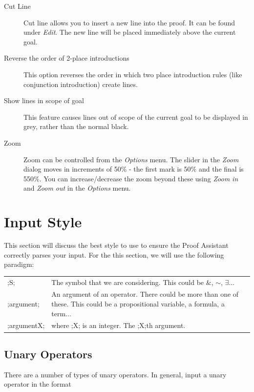 \documentclass[a4paper]{article}
\begin{document}
\begin{description}
	\item[Cut Line] Cut line allows you to insert a new line into the proof. It can be found under \emph{Edit}. The new line will be placed immediately above the current goal.
	\item[Reverse the order of 2-place introductions] This option reverses the order in which two place introduction rules (like conjunction introduction) create lines.
	\item[Show lines in scope of goal] This feature causes lines out of scope of the current goal to be displayed in grey, rather than the normal black.
	\item[Zoom] Zoom can be controlled from the \emph{Options} menu. The slider in the \emph{Zoom} dialog moves in increments of 50\% - the first mark is 50\% and the final is 550\%. You can increase/decrease the zoom beyond these using \emph{Zoom in} and \emph{Zoom out} in the \emph{Options} menu.
\end{description}

\section{Input Style}
\label{sec:InputStyle}
This section will discuss the best style to use to ensure the Proof Assistant correctly parses your input. For the this section, we will use the following paradigm:

\begin{table}[htbp]
\begin{tabular}{l p{9cm}}
;S; & The symbol that we are considering. This could be $\&$, $\sim$, $\exists$... \\
;argument; & An argument of an operator. There could be more than one of these. This could be a propositional variable, a formula, a term... \\
;argumentX; & where ;X; is an integer. The ;X;th argument.
\end{tabular}
\end{table}

\subsection{Unary Operators}
There are a number of types of unary operators. In general, input a unary operator in the format
\end{document}
